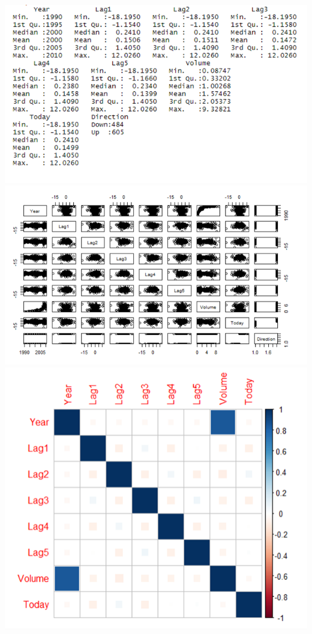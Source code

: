\documentclass{article}
\begin{document}
\begin{center}
\includegraphics[scale = 0.46]{2.13.a - 1.png} \\
\includegraphics[scale = 0.46]{2.13.a - 2.png} \\
\includegraphics[scale = 0.46]{2.13.a - 3.png} \\
\end{center}
\end{document}
